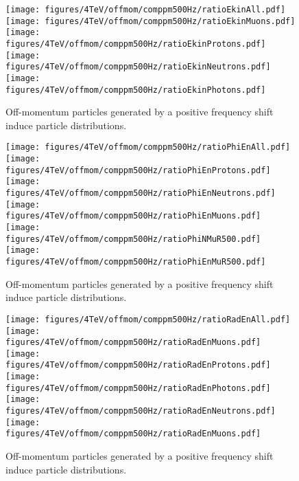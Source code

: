 \begin{figure}[!htb]
\begin{center}
  \texttt{[image: figures/4TeV/offmom/comppm500Hz/ratioEkinAll.pdf]}
  \texttt{[image: figures/4TeV/offmom/comppm500Hz/ratioEkinMuons.pdf]}
  \texttt{[image: figures/4TeV/offmom/comppm500Hz/ratioEkinProtons.pdf]}
  \texttt{[image: figures/4TeV/offmom/comppm500Hz/ratioEkinNeutrons.pdf]}
  \texttt{[image: figures/4TeV/offmom/comppm500Hz/ratioEkinPhotons.pdf]}
\end{center}
\vspace{-0.6cm}
 \caption{Off-momentum particles generated by a positive frequency shift induce particle distributions.
  \label{compPM_ekin}}
\end{figure}

\begin{figure}[!htb]
\begin{center}
  \texttt{[image: figures/4TeV/offmom/comppm500Hz/ratioPhiEnAll.pdf]}
  \texttt{[image: figures/4TeV/offmom/comppm500Hz/ratioPhiEnProtons.pdf]}
  \texttt{[image: figures/4TeV/offmom/comppm500Hz/ratioPhiEnNeutrons.pdf]}
  \texttt{[image: figures/4TeV/offmom/comppm500Hz/ratioPhiEnMuons.pdf]}
  \texttt{[image: figures/4TeV/offmom/comppm500Hz/ratioPhiNMuR500.pdf]}
  \texttt{[image: figures/4TeV/offmom/comppm500Hz/ratioPhiEnMuR500.pdf]}
\end{center}
\vspace{-0.6cm}
 \caption{Off-momentum particles generated by a positive frequency shift induce particle distributions.
  \label{compPM_phien}}
\end{figure}

\begin{figure}[!htb]
\begin{center}
  \texttt{[image: figures/4TeV/offmom/comppm500Hz/ratioRadEnAll.pdf]}
  \texttt{[image: figures/4TeV/offmom/comppm500Hz/ratioRadEnMuons.pdf]}
  \texttt{[image: figures/4TeV/offmom/comppm500Hz/ratioRadEnProtons.pdf]}
  \texttt{[image: figures/4TeV/offmom/comppm500Hz/ratioRadEnPhotons.pdf]}
  \texttt{[image: figures/4TeV/offmom/comppm500Hz/ratioRadEnNeutrons.pdf]}
  \texttt{[image: figures/4TeV/offmom/comppm500Hz/ratioRadEnMuons.pdf]}
\end{center}
\vspace{-0.6cm}
 \caption{Off-momentum particles generated by a positive frequency shift induce particle distributions.
  \label{compPM_raden}}
\end{figure}

